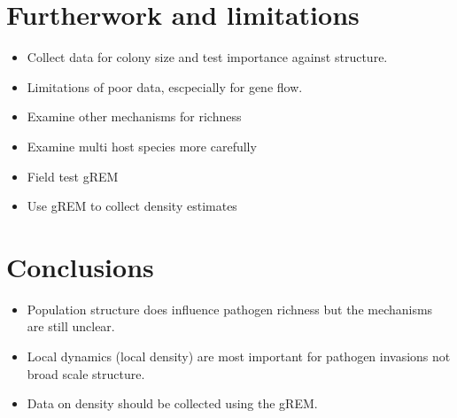 \section{Furtherwork and limitations}

\begin{itemize}
\item Collect data for colony size and test importance against structure.
\item Limitations of poor data, escpecially for gene flow.
\item Examine other mechanisms for richness
\item Examine multi host species more carefully
\item Field test gREM
\item Use gREM to collect density estimates 
\end{itemize}


\section{Conclusions}

\begin{itemize}
\item Population structure does influence pathogen richness but the mechanisms are still unclear.
\item Local dynamics (local density) are most important for pathogen invasions not broad scale structure.
\item Data on density should be collected using the gREM.
\end{itemize}





